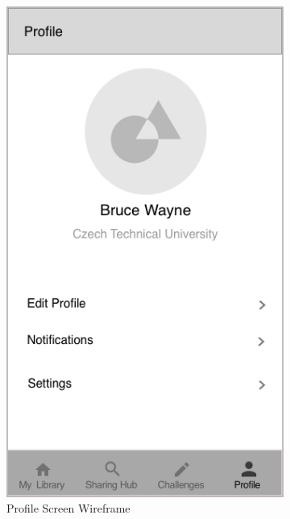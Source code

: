 \documentclass[thesis=B,english]{FITthesis}[2012/10/20]
\begin{document}
\begin{figure}[H]
\begin{subfigure}{.5\textwidth}
  \includegraphics[scale=0.45]{profile}
  \caption{Profile Screen Wireframe}
  \label{fig:section-profile}
\end{subfigure}%
\begin{subfigure}{.5\textwidth}

\end{subfigure}
\end{figure}
\end{document}
